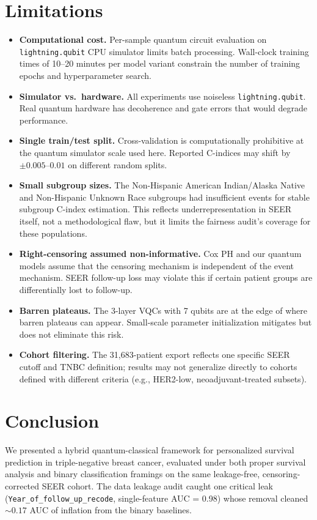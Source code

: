 \documentclass[12pt, letterpaper]{article}
\begin{document}
\section{Limitations}

\begin{itemize}
    \item \textbf{Computational cost.} Per-sample quantum circuit evaluation on \texttt{lightning.qubit} CPU simulator limits batch processing. Wall-clock training times of 10--20 minutes per model variant constrain the number of training epochs and hyperparameter search.
    \item \textbf{Simulator vs.\ hardware.} All experiments use noiseless \texttt{lightning.qubit}. Real quantum hardware has decoherence and gate errors that would degrade performance.
    \item \textbf{Single train/test split.} Cross-validation is computationally prohibitive at the quantum simulator scale used here. Reported C-indices may shift by $\pm 0.005$--$0.01$ on different random splits.
    \item \textbf{Small subgroup sizes.} The Non-Hispanic American Indian/Alaska Native and Non-Hispanic Unknown Race subgroups had insufficient events for stable subgroup C-index estimation. This reflects underrepresentation in SEER itself, not a methodological flaw, but it limits the fairness audit's coverage for these populations.
    \item \textbf{Right-censoring assumed non-informative.} Cox PH and our quantum models assume that the censoring mechanism is independent of the event mechanism. SEER follow-up loss may violate this if certain patient groups are differentially lost to follow-up.
    \item \textbf{Barren plateaus.} The 3-layer VQCs with 7 qubits are at the edge of where barren plateaus can appear. Small-scale parameter initialization mitigates but does not eliminate this risk.
    \item \textbf{Cohort filtering.} The 31{,}683-patient export reflects one specific SEER cutoff and TNBC definition; results may not generalize directly to cohorts defined with different criteria (e.g., HER2-low, neoadjuvant-treated subsets).
\end{itemize}


\section{Conclusion}

We presented a hybrid quantum-classical framework for personalized survival prediction in triple-negative breast cancer, evaluated under both proper survival analysis and binary classification framings on the same leakage-free, censoring-corrected SEER cohort. The data leakage audit caught one critical leak (\texttt{Year\_of\_follow\_up\_recode}, single-feature AUC = 0.98) whose removal cleaned $\sim 0.17$ AUC of inflation from the binary baselines.
\end{document}
